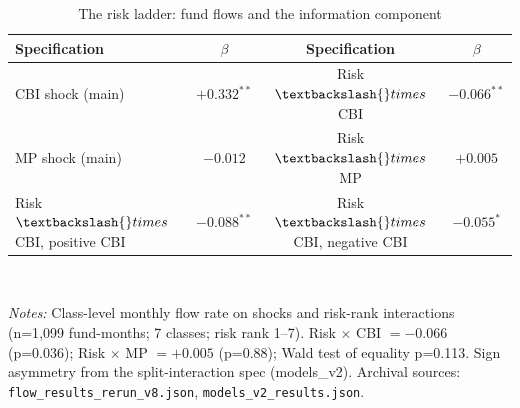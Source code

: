 \begin{table}[!tbp]
\centering\small
\caption{The risk ladder: fund flows and the information component}
\label{tab:61}
\begin{tabular}{lccc}
\toprule
Specification & $\beta$ & Specification & $\beta$ \\
\midrule
CBI shock (main) & $+0.332^{**}$ & Risk $\textbackslash\{\}times$ CBI & $-0.066^{**}$ \\
MP shock (main) & $-0.012$ & Risk $\textbackslash\{\}times$ MP & $+0.005$ \\
Risk $\textbackslash\{\}times$ CBI, positive CBI & $-0.088^{**}$ & Risk $\textbackslash\{\}times$ CBI, negative CBI & $-0.055^{*}$ \\
\bottomrule
\end{tabular}
\\[2pt]\begin{minipage}{0.92\linewidth}\footnotesize\emph{Notes:} Class-level monthly flow rate on shocks and risk-rank interactions (n=1{,}099 fund-months; 7 classes; risk rank 1--7). Risk $\times$ CBI $=-0.066$ (p=0.036); Risk $\times$ MP $=+0.005$ (p=0.88); Wald test of equality p=0.113. Sign asymmetry from the split-interaction spec (models\_v2). Archival sources: \texttt{flow\_results\_rerun\_v8.json}, \texttt{models\_v2\_results.json}.\end{minipage}
\end{table}
